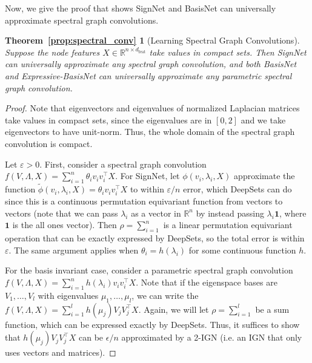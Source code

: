 \documentclass{article} \usepackage{iclr2023_conference,times}
\newcommand{\RR}{\mathbb R}
\newcommand{\mrm}[1]{\mathrm{#1}}
\newcommand{\dfeat}{d_{\mrm{feat}}}
\begin{document}
Now, we give the proof that shows SignNet and BasisNet can universally approximate spectral graph convolutions.
\newtheorem*{prop:spectral_conv}{Theorem~\ref{prop:spectral_conv}}
\begin{prop:spectral_conv}[Learning Spectral Graph Convolutions]
    Suppose the node features $X \in \RR^{n \times \dfeat}$ take values in compact sets. Then SignNet can universally approximate any spectral graph convolution, and both BasisNet and Expressive-BasisNet can universally approximate any parametric spectral graph convolution.
\end{prop:spectral_conv}
\begin{proof}
    Note that eigenvectors and eigenvalues of normalized Laplacian matrices take values in compact sets, since the eigenvalues are in $[0,2]$ and we take eigenvectors to have unit-norm. Thus, the whole domain of the spectral graph convolution is compact.

    Let $\varepsilon > 0$. First, consider a spectral graph convolution $f(V, \Lambda, X) = \sum_{i=1}^n \theta_i v_i v_i^\top X$. For SignNet, let $\phi(v_i, \lambda_i, X)$ approximate the function $\tilde \phi(v_i, \lambda_i, X) = \theta_i v_i v_i^\top X$ to within $\varepsilon/n$ error, which DeepSets can do since this is a continuous permutation equivariant function from vectors to vectors \citep{segol2019universal} (note that we can pass $\lambda_i$ as a vector in $\RR^n$ by instead passing $\lambda_i \mathbf{1}$, where $\mathbf{1}$ is the all ones vector). Then $\rho = \sum_{i=1}^n$ is a linear permutation equivariant operation that can be exactly expressed by DeepSets, so the total error is within $\varepsilon$. The same argument applies when $\theta_i = h(\lambda_i)$ for some continuous function $h$.
  
    For the basis invariant case, consider a parametric spectral graph convolution $f(V, \Lambda, X) = \sum_{i=1}^n h(\lambda_i) v_i v_i^\top X$. Note that if the eigenspace bases are $V_1, \ldots, V_l$ with eigenvalues $\mu_1, \ldots, \mu_l$, we can write the $f(V, \Lambda, X) = \sum_{i=1}^l h(\mu_j) V_j V_j^\top X$. Again, we will let $\rho=\sum_{i=1}^l $ be a sum function, which can be expressed exactly by DeepSets. Thus, it suffices to show that $h(\mu_j) V_j V_j^\top X$ can be $\epsilon/n$ approximated by a 2-IGN (i.e. an IGN that only uses vectors and matrices).


\end{proof}
\end{document}

